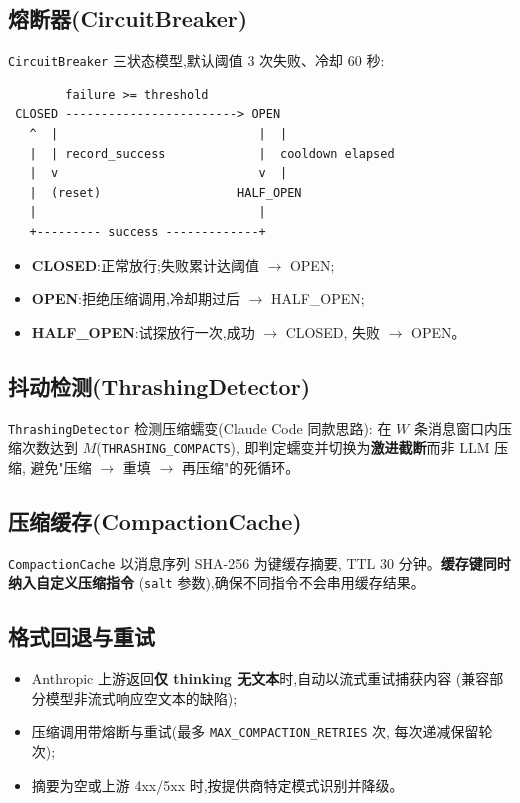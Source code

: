 \documentclass[11pt,a4paper]{article}
\begin{document}
\subsection{熔断器(CircuitBreaker)}

\texttt{CircuitBreaker} 三状态模型,默认阈值 3 次失败、冷却 60 秒:

\begin{verbatim}
        failure >= threshold
 CLOSED ------------------------> OPEN
   ^  |                            |  |
   |  | record_success             |  cooldown elapsed
   |  v                            v  |
   |  (reset)                   HALF_OPEN
   |                               |
   +--------- success -------------+
\end{verbatim}

\begin{itemize}
  \item \textbf{CLOSED}:正常放行;失败累计达阈值 $\rightarrow$ OPEN;
  \item \textbf{OPEN}:拒绝压缩调用,冷却期过后 $\rightarrow$ HALF\_OPEN;
  \item \textbf{HALF\_OPEN}:试探放行一次,成功 $\rightarrow$ CLOSED,
        失败 $\rightarrow$ OPEN。
\end{itemize}

\subsection{抖动检测(ThrashingDetector)}

\texttt{ThrashingDetector} 检测压缩蠕变(Claude Code 同款思路):
在 $W$ 条消息窗口内压缩次数达到 $M$(\texttt{THRASHING\_COMPACTS}),
即判定蠕变并切换为\textbf{激进截断}而非 LLM 压缩,
避免"压缩 $\rightarrow$ 重填 $\rightarrow$ 再压缩"的死循环。

\subsection{压缩缓存(CompactionCache)}

\texttt{CompactionCache} 以消息序列 SHA-256 为键缓存摘要,
TTL 30 分钟。\textbf{缓存键同时纳入自定义压缩指令}
(\texttt{salt} 参数),确保不同指令不会串用缓存结果。

\subsection{格式回退与重试}

\begin{itemize}
  \item Anthropic 上游返回\textbf{仅 thinking 无文本}时,自动以流式重试捕获内容
        (兼容部分模型非流式响应空文本的缺陷);
  \item 压缩调用带熔断与重试(最多 \texttt{MAX\_COMPACTION\_RETRIES} 次,
        每次递减保留轮次);
  \item 摘要为空或上游 4xx/5xx 时,按提供商特定模式识别并降级。
\end{itemize}
\end{document}
